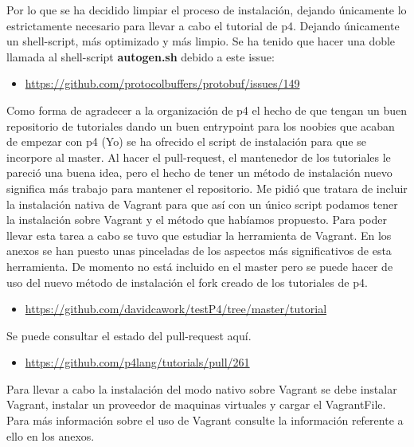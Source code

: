 Por lo que se ha decidido limpiar el proceso de instalación, dejando únicamente lo estrictamente necesario para llevar a cabo el tutorial de p4. Dejando únicamente un shell-script, más optimizado y  más limpio. Se ha tenido que hacer una doble llamada al shell-script \textbf{autogen.sh} debido a este issue:  
\begin{itemize}
    \item \url{https://github.com/protocolbuffers/protobuf/issues/149} 
\end{itemize}
Como forma de agradecer a la organización de p4 el hecho de que tengan un buen repositorio de tutoriales dando un buen entrypoint para los noobies que acaban de empezar con p4 (Yo) se ha ofrecido el script de instalación para que se incorpore al master.\newline
\newline
Al hacer el pull-request, el mantenedor de los tutoriales le pareció una buena idea, pero el hecho de tener un método de instalación nuevo significa más trabajo para mantener el repositorio. Me pidió que tratara de incluir la instalación nativa de Vagrant para que así con un único script podamos tener la instalación sobre Vagrant y el método que habíamos propuesto. Para poder llevar esta tarea a cabo se tuvo que estudiar la herramienta de Vagrant. En los anexos se han puesto unas pinceladas de los aspectos más significativos de esta herramienta. \newline
\newline
De momento no está incluido en el master pero se puede hacer de uso del nuevo método de instalación el fork creado de los tutoriales de p4.
\begin{itemize}
    \item \url{https://github.com/davidcawork/testP4/tree/master/tutorial}
\end{itemize}
Se puede consultar el estado del pull-request aquí.
\begin{itemize}
    \item \url{https://github.com/p4lang/tutorials/pull/261}
\end{itemize}

Para llevar a cabo la instalación del modo nativo sobre Vagrant se debe instalar Vagrant, instalar un proveedor de maquinas virtuales y cargar el VagrantFile. Para más información sobre el uso de Vagrant consulte la información referente a ello en los anexos.
\newpage



